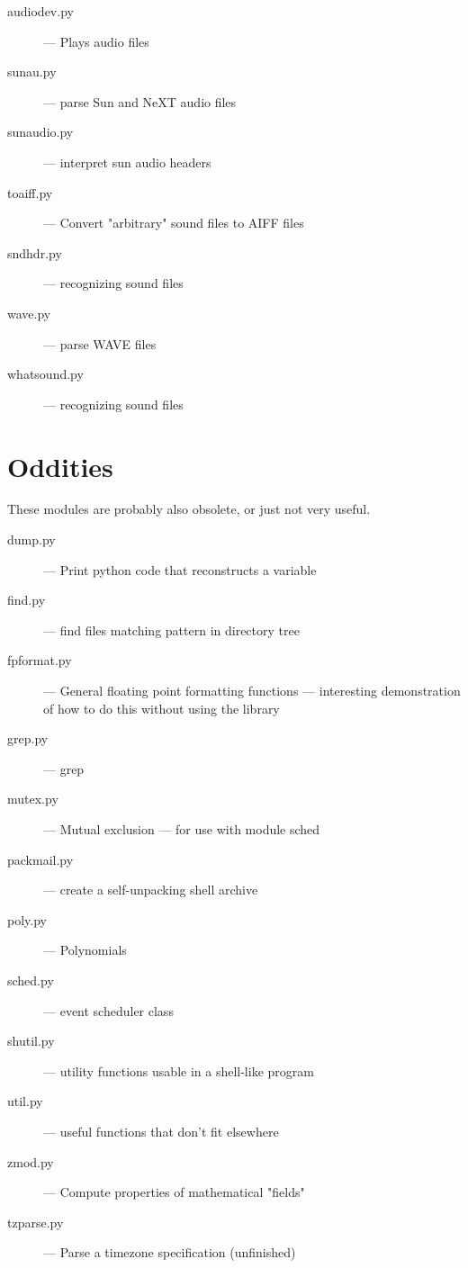 \begin{description}
\item[audiodev.py]
--- Plays audio files

\item[sunau.py]
--- parse Sun and NeXT audio files

\item[sunaudio.py]
--- interpret sun audio headers

\item[toaiff.py]
--- Convert "arbitrary" sound files to AIFF files

\item[sndhdr.py]
--- recognizing sound files

\item[wave.py]
--- parse WAVE files

\item[whatsound.py]
--- recognizing sound files
\end{description}


\section{Oddities}

These modules are probably also obsolete, or just not very useful.

\begin{description}
\item[dump.py]
--- Print python code that reconstructs a variable

\item[find.py]
--- find files matching pattern in directory tree

\item[fpformat.py]
--- General floating point formatting functions ---
interesting demonstration of how to do this without using the \C{}
library

\item[grep.py]
--- grep

\item[mutex.py]
--- Mutual exclusion --- for use with module sched

\item[packmail.py]
--- create a self-unpacking \UNIX{} shell archive

\item[poly.py]
--- Polynomials

\item[sched.py]
--- event scheduler class

\item[shutil.py]
--- utility functions usable in a shell-like program

\item[util.py]
--- useful functions that don't fit elsewhere

\item[zmod.py]
--- Compute properties of mathematical "fields"

\item[tzparse.py]
--- Parse a timezone specification (unfinished)
\end{description}


